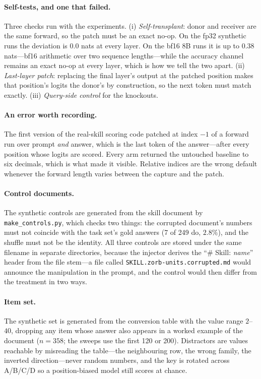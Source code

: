 \documentclass{article}
\begin{document}
\paragraph{Self-tests, and one that failed.} Three checks run with the
experiments. (i) \emph{Self-transplant}: donor and receiver are the same
forward, so the patch must be an exact no-op. On the fp32 synthetic runs the
deviation is $0.0$ nats at every layer. On the bf16 8B runs it is up to $0.38$
nats---bf16 arithmetic over two sequence lengths---while the accuracy channel
remains an exact no-op at every layer, which is how we tell the two apart.
(ii) \emph{Last-layer patch}: replacing the final layer's output at the patched
position makes that position's logits the donor's by construction, so the next
token must match exactly. (iii) \emph{Query-side control} for the knockouts.

\paragraph{An error worth recording.} The first version of the real-skill
scoring code patched at index $-1$ of a forward run over prompt \emph{and}
answer, which is the last token of the answer---after every position whose
logits are scored. Every arm returned the untouched baseline to six decimals,
which is what made it visible. Relative indices are the wrong default whenever
the forward length varies between the capture and the patch.

\paragraph{Control documents.} The synthetic controls are generated from the
skill document by \texttt{make\_controls.py}, which checks two things: the
corrupted document's numbers must not coincide with the task set's gold answers
(7 of 249 do, $2.8\%$), and the shuffle must not be the identity. All three
controls are stored under the same filename in separate directories, because the
injector derives the ``\# Skill: \emph{name}'' header from the file stem---a file
called \texttt{SKILL.zorb-units.corrupted.md} would announce the manipulation in
the prompt, and the control would then differ from the treatment in two ways.

\paragraph{Item set.} The synthetic set is generated from the conversion table
with the value range $2$--$40$, dropping any item whose answer also appears in a
worked example of the document ($n=358$; the sweeps use the first 120 or 200).
Distractors are values reachable by misreading the table---the neighbouring row,
the wrong family, the inverted direction---never random numbers, and the key is
rotated across A/B/C/D so a position-biased model still scores at chance.
\end{document}
